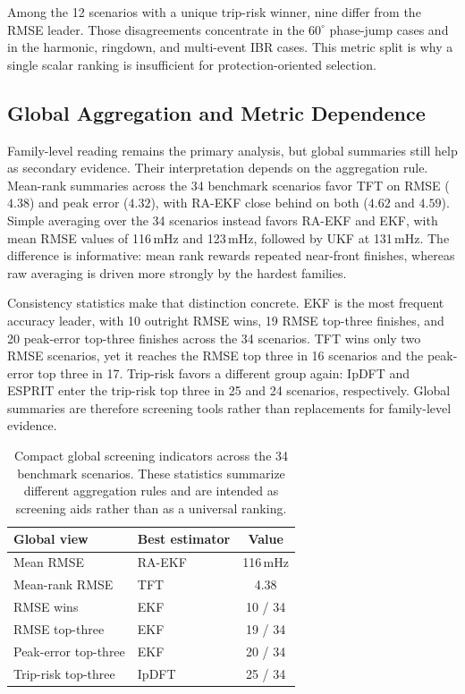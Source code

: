 \documentclass[conference,letterpaper]{IEEEtran}
\begin{document}
Among the 12 scenarios with a unique trip-risk winner, nine differ from the
RMSE leader. Those disagreements concentrate in the $60^\circ$ phase-jump
cases and in the harmonic, ringdown, and multi-event IBR cases. This metric
split is why a single scalar ranking is insufficient for
protection-oriented selection.

\subsection{Global Aggregation and Metric Dependence}

Family-level reading remains the primary analysis, but global summaries still
help as secondary evidence. Their interpretation depends on the aggregation
rule. Mean-rank summaries across the 34 benchmark scenarios favor TFT on RMSE
($4.38$) and peak error ($4.32$), with RA-EKF close behind on both ($4.62$
and $4.59$). Simple averaging over the 34 scenarios instead favors RA-EKF and
EKF, with mean RMSE values of 116\,mHz and 123\,mHz, followed by UKF at
131\,mHz. The difference is informative: mean rank rewards repeated near-front
finishes, whereas raw averaging is driven more strongly by the hardest
families.

Consistency statistics make that distinction concrete. EKF is the most frequent
accuracy leader, with 10 outright RMSE wins, 19 RMSE top-three finishes, and
20 peak-error top-three finishes across the 34 scenarios. TFT wins only two
RMSE scenarios, yet it reaches the RMSE top three in 16 scenarios and the
peak-error top three in 17. Trip-risk favors a different group again: IpDFT
and ESPRIT enter the trip-risk top three in 25 and 24 scenarios, respectively.
Global summaries are therefore screening tools rather than replacements for
family-level evidence.

\begin{table}[t]
  \centering
  \caption{Compact global screening indicators across the 34 benchmark
    scenarios. These statistics summarize different aggregation rules and are
    intended as screening aids rather than as a universal ranking.}
  \label{tab:global_screening}
  \scriptsize
  \setlength{\tabcolsep}{3pt}
  \renewcommand{\arraystretch}{1.08}
  \begin{tabular}{L{1.85cm} L{2.1cm} c}
    \toprule
    Global view & Best estimator & Value \\
    \midrule
    Mean RMSE & RA-EKF & 116\,mHz \\
    Mean-rank RMSE & TFT & 4.38 \\
    RMSE wins & EKF & 10 / 34 \\
    RMSE top-three & EKF & 19 / 34 \\
    Peak-error top-three & EKF & 20 / 34 \\
    Trip-risk top-three & IpDFT & 25 / 34 \\
    \bottomrule
  \end{tabular}
\end{table}
\end{document}
